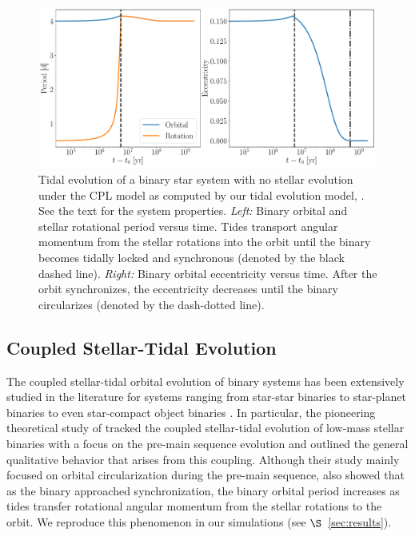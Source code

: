 \begin{figure}[t]
	\includegraphics[width=\textwidth]{eqtide_example.pdf}
    \caption{Tidal evolution of a binary star system with no stellar evolution under the CPL model \citep{FerrazMello2008,Heller2011} as computed by our tidal evolution model, \eqtide.  See the text for the system properties. {\it Left:} Binary orbital and stellar rotational period versus time.  Tides transport angular momentum from the stellar rotations into the orbit until the binary becomes tidally locked and synchronous (denoted by the black dashed line).  {\it Right:} Binary orbital eccentricity versus time.  After the orbit synchronizes, the eccentricity decreases until the binary circularizes (denoted by the dash-dotted line).}
    \label{fig:eqtide_example}
\end{figure}


\subsection{Coupled Stellar-Tidal Evolution} \label{sec:coupled_evolution} 

The coupled stellar-tidal orbital evolution of binary systems has been extensively studied in the literature for systems ranging from star-star binaries \citep[e.g.][]{Huang1966,Mestel1968,VantVeer1988,Zahn1989,Li1998,Khaliullin2011} to star-planet binaries \cite[e.g.][]{DobbsDixon2004,Barker2009,Lanza2016} to even star-compact object binaries \citep[e.g.][]{Verbunt1981,Repetto2014}.  In particular, the pioneering theoretical study of \citet{Zahn1989} tracked the coupled stellar-tidal evolution of low-mass stellar binaries with a focus on the pre-main sequence evolution and outlined the general qualitative behavior that arises from this coupling.  Although their study mainly focused on orbital circularization during the pre-main sequence, \citet{Zahn1989} also showed that as the binary approached synchronization, the binary orbital period increases as tides transfer rotational angular momentum from the stellar rotations to the orbit.  We reproduce this phenomenon in our simulations (see $\S$~\ref{sec:results}).

